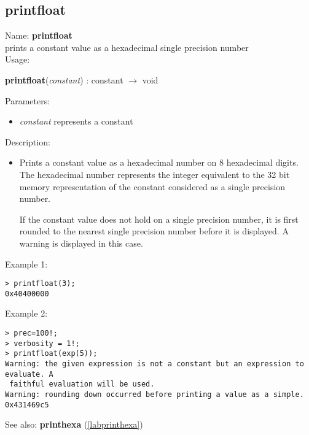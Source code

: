 \subsection{printfloat}
\label{labprintfloat}
\noindent Name: \textbf{printfloat}\\
prints a constant value as a hexadecimal single precision number\\
\noindent Usage: 
\begin{center}
\textbf{printfloat}(\emph{constant}) : \textsf{constant} $\rightarrow$ \textsf{void}\\
\end{center}
Parameters: 
\begin{itemize}
\item \emph{constant} represents a constant
\end{itemize}
\noindent Description: \begin{itemize}

\item Prints a constant value as a hexadecimal number on 8 hexadecimal
   digits. The hexadecimal number represents the integer equivalent to
   the 32 bit memory representation of the constant considered as a
   single precision number.
    
   If the constant value does not hold on a single precision number, it
   is first rounded to the nearest single precision number before it is
   displayed. A warning is displayed in this case.
\end{itemize}
\noindent Example 1: 
\begin{center}\begin{minipage}{15cm}\begin{Verbatim}[frame=single]
> printfloat(3);
0x40400000
\end{Verbatim}
\end{minipage}\end{center}
\noindent Example 2: 
\begin{center}\begin{minipage}{15cm}\begin{Verbatim}[frame=single]
> prec=100!;
> verbosity = 1!;
> printfloat(exp(5));
Warning: the given expression is not a constant but an expression to evaluate. A
 faithful evaluation will be used.
Warning: rounding down occurred before printing a value as a simple.
0x431469c5
\end{Verbatim}
\end{minipage}\end{center}
See also: \textbf{printhexa} (\ref{labprinthexa})
